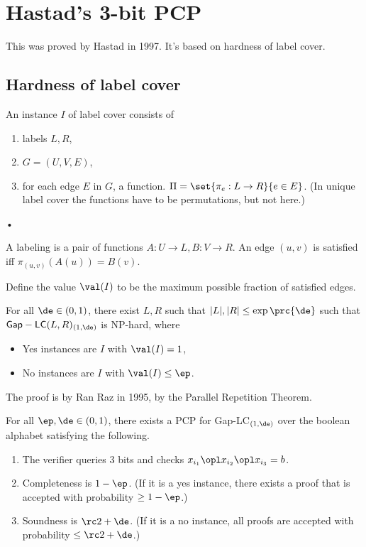 
\section{Hastad's 3-bit PCP}
This was proved by Hastad in 1997. It's based on hardness of label cover.

\subsection{Hardness of label cover}
\begin{df}
An instance $I$ of label cover consists of
\begin{enumerate}
\item
labels $L,R$,
\item
$G=(U,V,E)$,
\item
for each edge $E$ in $G$, a function. $\Pi=\set{\pi_e:L\to R}{e\in E}$. (In unique label cover the functions have to be permutations, but not here.)
\end{enumerate}•

A labeling is a pair of functions $A:U\to L, B:V\to R$. An edge $(u,v)$ is satisfied iff $\pi_{(u,v)} (A(u))=B(v)$. 

Define the value $\val(I)$ to be the maximum possible fraction of satisfied edges.
\end{df}

\begin{thm}
For all $\de\in (0,1)$, there exist $L,R$ such that $|L|,|R|\le \exp\prc{\de}$ such that $\mathsf{Gap-LC}(L,R)_{(1,\de)}$ is NP-hard, where 
\begin{itemize}
\item
Yes instances are $I$ with $\val(I)=1$,
\item
No instances are $I$ with $\val(I)\le \ep$.
\end{itemize}
\end{thm}
The proof is by Ran Raz in 1995, by the Parallel Repetition Theorem.

\begin{thm}
For all $\ep,\de\in (0,1)$, 
there exists a PCP for Gap-LC${}_{(1,\de)}$ over the boolean alphabet satisfying the following.
\begin{enumerate}
\item
The verifier queries 3 bits and checks $x_{i_1}\opl x_{i_2}\opl x_{i_3}=b$.
\item
Completeness is $1-\ep$.
(If it is a yes instance, there exists a proof that is accepted with probability $\ge 1-\ep$.)
\item
Soundness is $\rc2+\de$.
(If it is a no instance, all proofs are accepted with probability $\le \rc2+\de$.)
\end{enumerate}
\end{thm}

